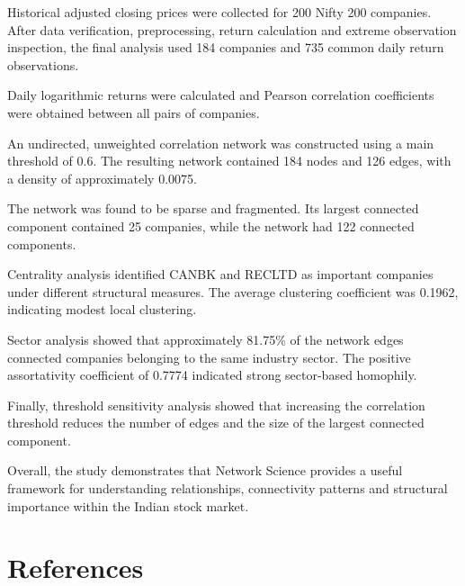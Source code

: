 \documentclass[11pt,a4paper]{article}
\begin{document}
Historical adjusted closing prices were collected
for 200 Nifty 200 companies. After data verification,
preprocessing, return calculation and extreme
observation inspection, the final analysis used
184 companies and 735 common daily return observations.

Daily logarithmic returns were calculated and
Pearson correlation coefficients were obtained
between all pairs of companies.

An undirected, unweighted correlation network
was constructed using a main threshold of 0.6.
The resulting network contained 184 nodes and
126 edges, with a density of approximately 0.0075.

The network was found to be sparse and fragmented.
Its largest connected component contained
25 companies, while the network had 122 connected
components.

Centrality analysis identified CANBK and RECLTD
as important companies under different structural
measures. The average clustering coefficient
was 0.1962, indicating modest local clustering.

Sector analysis showed that approximately
81.75\% of the network edges connected companies
belonging to the same industry sector. The positive
assortativity coefficient of 0.7774 indicated
strong sector-based homophily.

Finally, threshold sensitivity analysis showed
that increasing the correlation threshold reduces
the number of edges and the size of the largest
connected component.

Overall, the study demonstrates that Network
Science provides a useful framework for understanding
relationships, connectivity patterns and structural
importance within the Indian stock market.

\section{References}
\end{document}
